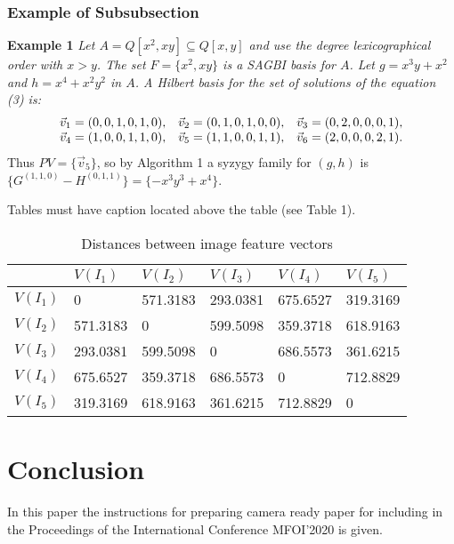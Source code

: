 \documentclass[11pt,twoside,a5paper]{article}
\begin{document}
\subsubsection{Example of Subsubsection}

\textbf{Example 1} \textit{Let $A=Q[x^{2}, xy] \subseteq  Q[x, y]$ and use the degree lexicographical order with $x>y$. The set $F=\{x^{2}, xy\}$ is a SAGBI basis for $A$. Let $g=x^{3}y+x^{2}$ and $h=x^{4}+x^{2}y^{2}$ in $A$. A Hilbert basis for the set of solutions of the equation (3) is:} 
\[
{\begin{array}{*{20}c}
 {\vec {v}_1 =(0,0,1,0,1,0),} \hfill & {\vec {v}_2 =(0,1,0,1,0,0),} \hfill & 
{\vec {v}_3 =(0,2,0,0,0,1),} \hfill \\
 {\vec {v}_4 =(1,0,0,1,1,0),} \hfill & {\vec {v}_5 =(1,1,0,0,1,1),} \hfill & 
{\vec {v}_6 =(2,0,0,0,2,1).} \hfill \\
\end{array} }
\]
Thus $PV=\{\vec {v}_5 \}$, so by Algorithm 1 a syzygy family for $(g, h)$ is 
$\{G^{(1,1,0)}-H^{(0,1,1)}\}=\{-x^{3}y^{3}+x^{4}\}$.

Tables must have caption located above the table (see Table 1).

\begin{table}[htbp]
\caption{Distances between image feature vectors} \vspace{3mm}
\begin{tabular}
{|p{34pt}|p{44pt}|p{44pt}|p{44pt}|p{44pt}|p{44pt}|} \hline &
$V(I_{1} )$& $V(I_{2} )$& $V(I_{3} )$& $V(I_{4} )$&
$V(I_{5} )$ \\
\hline $V(I_{1} )$& 0& 571.3183& 293.0381& 675.6527&
319.3169 \\
\hline $V(I_{2} )$& 571.3183& 0& 599.5098& 359.3718&
618.9163 \\
\hline $V(I_{3} )$& 293.0381& 599.5098& 0& 686.5573&
361.6215 \\
\hline $V(I_{4} )$& 675.6527& 359.3718& 686.5573& 0&
712.8829 \\
\hline $V(I_{5} )$& 319.3169& 618.9163& 361.6215& 712.8829&
0 \\
\hline
\end{tabular}
\label{tab1}
\end{table}


\section{Conclusion}

In this paper the instructions for preparing camera ready paper for 
including in the Proceedings of the International Conference MFOI'2020  is 
given.
\end{document}
